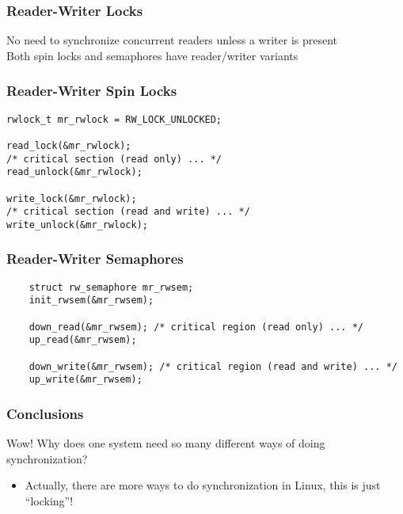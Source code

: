 \begin{frame}[fragile]
    \frametitle{Reader-Writer Locks }
    \Large
    No need to synchronize concurrent readers unless a
    writer is present \\
    
    
    Both spin locks and semaphores have reader/writer
    variants
\end{frame}


\begin{frame}[fragile]
    \frametitle{Reader-Writer Spin Locks}
    \large    
    \begin{block}{}
        \begin{verbatim}
rwlock_t mr_rwlock = RW_LOCK_UNLOCKED;

read_lock(&mr_rwlock);
/* critical section (read only) ... */
read_unlock(&mr_rwlock);

write_lock(&mr_rwlock);
/* critical section (read and write) ... */
write_unlock(&mr_rwlock);

        \end{verbatim}
    \end{block} 
\end{frame}

\begin{frame}[fragile]
    \frametitle{Reader-Writer Semaphores}
    \large    
    \begin{block}{}
        \begin{verbatim}
    struct rw_semaphore mr_rwsem;
    init_rwsem(&mr_rwsem);
    
    down_read(&mr_rwsem); /* critical region (read only) ... */
    up_read(&mr_rwsem);
    
    down_write(&mr_rwsem); /* critical region (read and write) ... */
    up_write(&mr_rwsem);
\end{verbatim}
    \end{block} 
\end{frame}


\begin{frame}[fragile]
    \frametitle{Conclusions}
    \Large    
Wow! Why does one system need so many different
ways of doing synchronization?
    \begin{itemize}
    \item  Actually, there are more ways to do synchronization in
    Linux, this is just “locking”!
\end{itemize}  
\end{frame}


